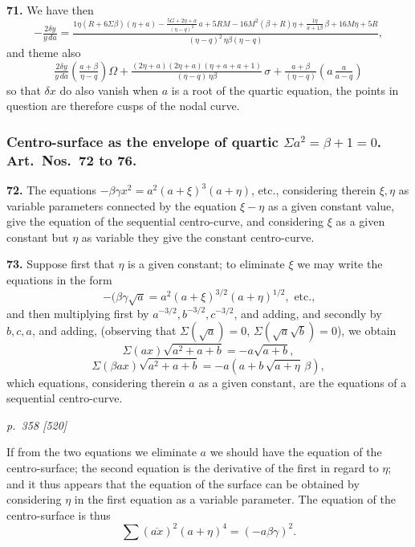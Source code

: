 \documentclass[11pt,a4paper]{article}
\theoremstyle{plain}
\theoremstyle{definition}
\begin{document}
\textbf{71.} We have then
\[
-\tfrac{2\delta y}{y\,da} = \tfrac{1\eta(R + 6\Sigma\beta)(\eta + a) - \tfrac{5G + 2\eta + a}{(\eta - q)^2}\,a + 5RM - 16M^2(\beta + R)\eta + \tfrac{1\eta}{a + 1\beta}\,\beta + 16M\eta + 5R}{(\eta - q)^2\,\eta\beta(\eta - q)},
\]
and theme also
\[
\tfrac{2\delta y}{y\,da}\!\!\left(\tfrac{a + \beta}{\eta - q}\!\right)\Omega + \tfrac{(2\eta + a)(2\eta + a)(\eta + a + a + 1)}{(\eta - q)\,\eta\beta}\,\sigma + \tfrac{a + \beta}{(\eta - q)}\!\left(a\,\tfrac{a}{a - q}\right)
\]
so that $\delta x$ do also vanish when $a$ is a root of the quartic equation, the points in question are therefore cusps of the nodal curve.

\subsubsection*{Centro-surface as the envelope of quartic $\Sigma a^2 = \beta + 1 = 0$. Art.\ Nos.\ 72 to 76.}

\textbf{72.} The equations $-\beta\gamma x^2 = a^2(a + \xi)^3(a + \eta)$, etc., considering therein $\xi, \eta$ as variable parameters connected by the equation $\xi - \eta$ as a given constant value, give the equation of the sequential centro-curve, and considering $\xi$ as a given constant but $\eta$ as variable they give the constant centro-curve.

\textbf{73.} Suppose first that $\eta$ is a given constant; to eliminate $\xi$ we may write the equations in the form
\[
-(\beta\gamma\sqrt{a} = a^2(a + \xi)^{3/2}(a + \eta)^{1/2},\text{ etc.,}
\]
and then multiplying first by $a^{-3/2}, b^{-3/2}, c^{-3/2}$, and adding, and secondly by $b, c, a$, and adding, (observing that $\Sigma\!\left(\sqrt{a}\right) = 0$, $\Sigma(\sqrt{a}\sqrt{b}) = 0$), we obtain
\[
\Sigma(a x)\sqrt{a^2 + a + b} = -a\sqrt{a + b},
\]
\[
\Sigma(\beta a x)\sqrt{a^2 + a + b} = -a(a + b\,\sqrt{a + \eta}\,\beta),
\]
which equations, considering therein $a$ as a given constant, are the equations of a sequential centro-curve.

\clearpage

\bigskip
\textit{p.~358 [520]}
\smallskip

If from the two equations we eliminate $a$ we should have the equation of the centro-surface; the second equation is the derivative of the first in regard to $\eta$; and it thus appears that the equation of the surface can be obtained by considering $\eta$ in the first equation as a variable parameter. The equation of the centro-surface is thus
\[
\sum (\overline{a x})^2 (a + \eta)^4 = (- a \beta \gamma)^2.
\]
\end{document}
